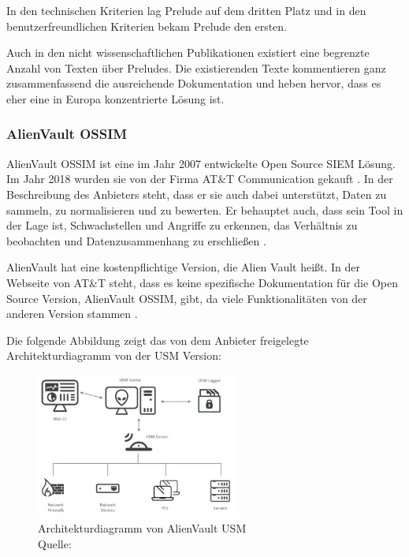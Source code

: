 In den technischen Kriterien lag Prelude auf dem dritten Platz und in den benutzerfreundlichen Kriterien bekam Prelude den ersten. 

Auch in den nicht wissenschaftlichen Publikationen existiert eine begrenzte Anzahl von Texten über Preludes. Die existierenden Texte kommentieren ganz zusammenfassend die ausreichende Dokumentation und heben hervor, dass es eher eine in Europa konzentrierte Lösung ist.

\subsubsection{AlienVault OSSIM}
AlienVault OSSIM ist eine im Jahr 2007 entwickelte \gls{Open Source} \gls{SIEM} Lösung. Im Jahr 2018 wurden sie von der Firma AT\&T Communication gekauft  \citep{CBN_AV}. In der Beschreibung des Anbieters steht, dass er sie auch dabei unterstützt, Daten zu sammeln, zu normalisieren und zu bewerten. Er behauptet auch, dass sein Tool in der Lage ist, Schwachstellen und Angriffe zu erkennen, das Verhältnis zu beobachten und Datenzusammenhang zu erschließen \citep{ATT_AVO}. 

AlienVault hat eine kostenpflichtige Version, die Alien Vault  heißt. In der Webseite von AT\&T steht, dass es keine spezifische Dokumentation für die \gls{Open Source} Version, AlienVault OSSIM, gibt, da viele Funktionalitäten von der anderen Version stammen \citep{ATT_AVO}. 

\newpage
Die folgende Abbildung zeigt das von dem Anbieter freigelegte Architekturdiagramm von der \gls{USM} Version:

\begin{figure}[H]
   \centering
   \includegraphics[width=0.6\textwidth]{assets/2_p6.png}
   \caption{Architekturdiagramm  von AlienVault \gls{USM} \\Quelle: \citep{ATT_AVO} }
   \centering
\end{figure}

